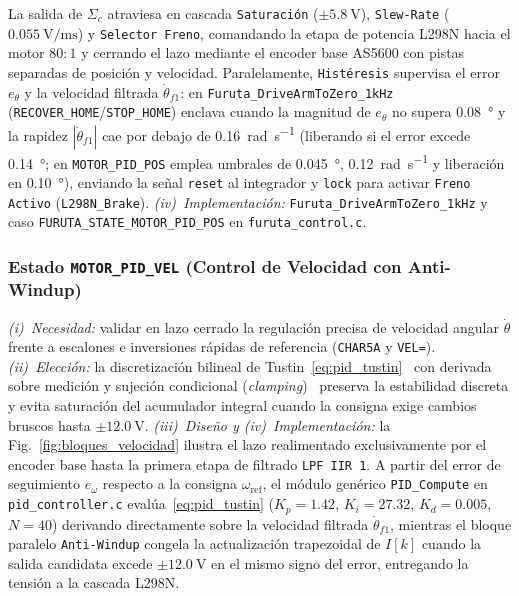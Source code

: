 La salida de $\Sigma_c$ atraviesa en cascada \texttt{Saturación} ($\pm\qty{5.8}{\volt}$), \texttt{Slew-Rate} ($\qty{0.055}{\volt\per\milli\second}$) y \texttt{Selector Freno}, comandando la etapa de potencia L298N hacia el motor $80:1$ y cerrando el lazo mediante el encoder base AS5600 con pistas separadas de posición y velocidad. Paralelamente, \texttt{Histéresis} supervisa el error $e_\theta$ y la velocidad filtrada $\dot{\theta}_{f1}$: en \texttt{Furuta\_\allowbreak DriveArmToZero\_\allowbreak 1kHz} (\texttt{RECOVER\_HOME}/\texttt{STOP\_HOME}) enclava cuando la magnitud de $e_\theta$ no supera \qty{0.08}{\degree} y la rapidez $|\dot{\theta}_{f1}|$ cae por debajo de \qty{0.16}{\radian\per\second} (liberando si el error excede \qty{0.14}{\degree}; en \texttt{MOTOR\_PID\_POS} emplea umbrales de \qty{0.045}{\degree}, \qty{0.12}{\radian\per\second} y liberación en \qty{0.10}{\degree}), enviando la señal \texttt{reset} al integrador y \texttt{lock} para activar \texttt{Freno Activo} (\texttt{L298N\_Brake}).
\textit{(iv)~Implementación:} \texttt{Furuta\_\allowbreak DriveArmToZero\_\allowbreak 1kHz} y caso \texttt{FURUTA\_\allowbreak STATE\_\allowbreak MOTOR\_\allowbreak PID\_\allowbreak POS} en \texttt{furuta\_control.c}.

\subsubsection{Estado \texttt{MOTOR\_PID\_VEL} (Control de Velocidad con Anti-Windup)}



\textit{(i)~Necesidad:} validar en lazo cerrado la regulación precisa de velocidad angular $\dot{\theta}$ frente a escalones e inversiones rápidas de referencia (\texttt{CHAR5A} y \texttt{VEL=}).
\textit{(ii)~Elección:} la discretización bilineal de Tustin~\eqref{eq:pid_tustin}~\cite{Astrom1997,Ogata2010} con derivada sobre medición y sujeción condicional (\textit{clamping})~\cite{AstromAntiwindup1989,Peng1996} preserva la estabilidad discreta y evita saturación del acumulador integral cuando la consigna exige cambios bruscos hasta $\pm\qty{12.0}{\volt}$.
\textit{(iii)~Diseño y (iv)~Implementación:} la Fig.~\ref{fig:bloques_velocidad} ilustra el lazo realimentado exclusivamente por el encoder base hasta la primera etapa de filtrado \texttt{LPF IIR 1}. A partir del error de seguimiento $e_\omega$ respecto a la consigna $\omega_{\text{ref}}$, el módulo genérico \texttt{PID\_Compute} en \texttt{pid\_controller.c} evalúa~\eqref{eq:pid_tustin} ($K_p=1.42$, $K_i=27.32$, $K_d=0.005$, $N=40$) derivando directamente sobre la velocidad filtrada $\dot{\theta}_{f1}$, mientras el bloque paralelo \texttt{Anti-Windup} congela la actualización trapezoidal de $I[k]$ cuando la salida candidata excede $\pm\qty{12.0}{\volt}$ en el mismo signo del error, entregando la tensión a la cascada L298N.

